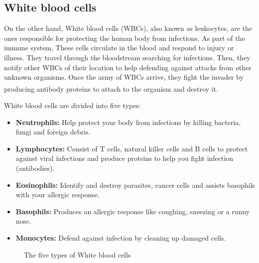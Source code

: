 \subsection{White blood cells}
\hspace{\parindent}
On the other hand, White blood cells (WBCs), also known as leukocytes, are the ones responsible for protecting the human body from infections. As part of the immune system, These cells circulate in the blood and respond to injury or illness. They travel through the bloodstream searching for infections. Then, they notify other WBCs of their location to help defending against attacks from other unknown organisms. Once the army of WBCs arrive, they fight the invader by producing antibody proteins to attach to the organism and destroy it. \textsuperscript{\cite{WBC-clevelandclinic}}

White blood cells are divided into five types:

\begin{itemize}
  \item \textbf{Neutrophils:} Help protect your body from infections by killing bacteria, fungi and foreign debris.
  \vspace{-0.05in}
  \item \textbf{Lymphocytes:} Consist of T cells, natural killer cells and B cells to protect against viral infections and produce proteins to help you fight infection (antibodies).
  \vspace{-0.05in}
  \item \textbf{Eosinophils:} Identify and destroy parasites, cancer cells and assists basophils with your allergic response.
  \vspace{-0.05in}
  \item \textbf{Basophils:} Produces an allergic response like coughing, sneezing or a runny nose.
  \vspace{-0.05in}
  \item \textbf{Monocytes:} Defend against infection by cleaning up damaged cells.
\end{itemize}

\begin{figure}[H]
\centering
  \vspace{-0.1in}
    \centerline{}
    \caption{The five types of White blood cells}
\end{figure}

